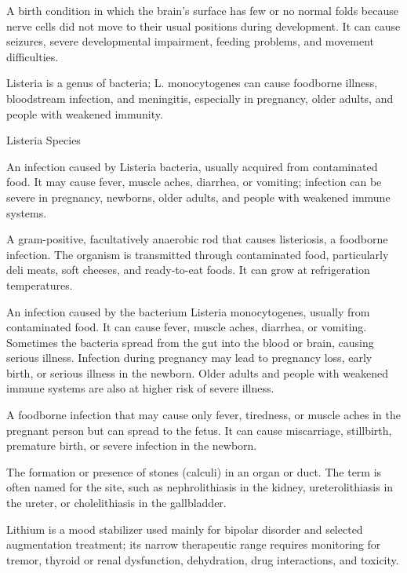  A birth condition in which the brain’s surface has few or no normal folds because nerve cells did not move to their usual positions during development. It can cause seizures, severe developmental impairment, feeding problems, and movement difficulties.

 Listeria is a genus of bacteria; L. monocytogenes can cause foodborne illness, bloodstream infection, and meningitis, especially in pregnancy, older adults, and people with weakened immunity.

\synonyms
Listeria Species

 An infection caused by Listeria bacteria, usually acquired from contaminated food. It may cause fever, muscle aches, diarrhea, or vomiting; infection can be severe in pregnancy, newborns, older adults, and people with weakened immune systems.

 A gram-positive, facultatively anaerobic rod that causes listeriosis, a foodborne
infection. The organism is transmitted through contaminated food, particularly deli
meats, soft cheeses, and ready-to-eat foods. It can grow at refrigeration temperatures.

 An infection caused by the bacterium Listeria monocytogenes, usually from contaminated food. It can cause fever, muscle aches, diarrhea, or vomiting. Sometimes the bacteria spread from the gut into the blood or brain, causing serious illness. Infection during pregnancy may lead to pregnancy loss, early birth, or serious illness in the newborn. Older adults and people with weakened immune systems are also at higher risk of severe illness.

 A foodborne infection that may cause only fever, tiredness, or muscle aches in the pregnant person but can spread to the fetus. It can cause miscarriage, stillbirth, premature birth, or severe infection in the newborn.

 The formation or presence of stones (calculi) in an organ or duct. The term is often named for the site, such as nephrolithiasis in the kidney, ureterolithiasis in the ureter, or cholelithiasis in the gallbladder.

 Lithium is a mood stabilizer used mainly for bipolar disorder and selected augmentation treatment; its narrow therapeutic range requires monitoring for tremor, thyroid or renal dysfunction, dehydration, drug interactions, and toxicity.

